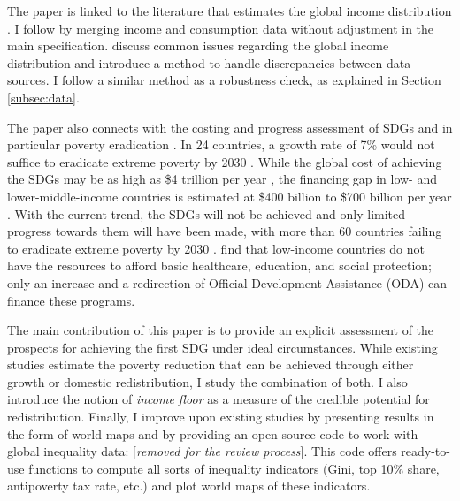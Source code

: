 \documentclass[12pt,english]{article}
\begin{document}
The paper is linked to the literature that estimates the global income distribution \citep{pinkovskiy_parametric_2009,anand_chapter_2015,lahoti_global_2016,lakner_global_2016,gradin_trends_2021,jorda_global_2019,alvaredo_methods_2021,fisher-post_government_2023,milanovic_three_2024}. 
I follow \cite{lakner_global_2016} by merging income and consumption data without adjustment in the main specification. 
\cite{anand_chapter_2015} discuss common issues regarding the global income distribution and introduce a method to handle discrepancies between data sources. I follow a similar method as a robustness check, as explained in Section \ref{subsec:data}. 

The paper also connects with the costing and progress assessment of SDGs and in particular poverty eradication \citep{schmidt-traub_investment_2015,rozenberg_beyond_2019,sdsn_sdg_2019,manuel_financing_2020,vorisek_understanding_2020,unctad_estimating_2021,un_sustainable_2022}. In 24 countries, a growth rate of 7\% would not suffice to eradicate extreme poverty by 2030 \citep{unctad_estimating_2021}. While the global cost of achieving the SDGs may be as high as \$4 trillion per year \citep{unctad_world_2023}, %
the financing gap in low- and lower-middle-income countries is estimated at \$400 billion \citep{sdsn_sdg_2019} %
to \$700 billion per year \citep{kharas_building_2019}. %
With the current trend, the SDGs will not be achieved and only limited progress towards them will have been made, with more than 60 countries failing to eradicate extreme poverty by 2030 \citep{moyer_are_2020}. %
\cite{manuel_financing_2018} find that low-income countries do not have the resources to afford basic healthcare, education, and social protection; only an increase and a redirection of Official Development Assistance (ODA) can finance these programs. 

The main contribution of this paper is to provide an explicit assessment of the prospects for achieving the first SDG under ideal circumstances. While existing studies estimate the poverty reduction that can be achieved through either growth or domestic redistribution, I study the combination of both. I also introduce the notion of \textit{income floor} as a measure of the credible potential for redistribution. Finally, I improve upon existing studies by presenting results in the form of world maps and by providing an open source code to work with global inequality data: [\textit{removed for the review process}]. This code offers ready-to-use functions to compute all sorts of inequality indicators (Gini, top 10\% share, antipoverty tax rate, etc.) and plot world maps of these indicators.
\end{document}
